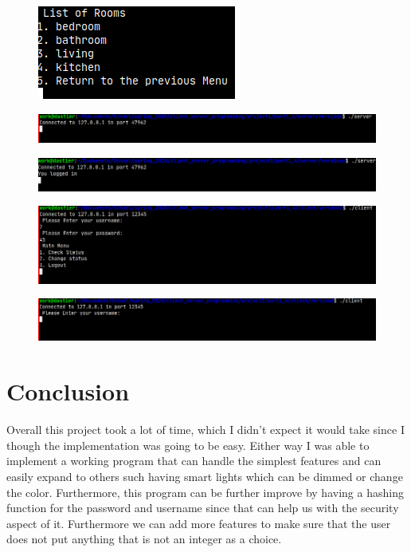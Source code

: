 \documentclass[11pt]{article}
\begin{document}
	\begin{figure}[H]
		\centering
		\includegraphics[scale=0.7]{testing_lightRoom}
		\caption[Testing check status of lights in a room]{}
		\label{fig:testinglightroom}
	\end{figure}
	\begin{figure}[H]
		\centering
		\includegraphics[scale=0.5]{testing_serverconnection}
		\caption[Testing server connection]{}
		\label{fig:testingserverconnection}
	\end{figure}
	\begin{figure}[H]
		\centering
		\includegraphics[scale=0.5]{testing_serverlogin}
		\caption[Testing server login]{}
		\label{fig:testingserverlogin}
	\end{figure}
	\begin{figure}[H]
		\centering
		\includegraphics[scale=0.5]{testing_Succesful_login}
		\caption[Testing succesfull login]{}
		\label{fig:testingsuccesfullogin}
	\end{figure}
	\begin{figure}[H]
		\centering
		\includegraphics[scale=0.5]{testing_userName}
		\caption[Testing username menu]{}
		\label{fig:testingusername}
	\end{figure}
	\section{Conclusion}
		Overall this project took a lot of time, which I didn't expect it would take since I though the implementation was going to be easy. Either way I was able to implement a working program that can handle the simplest features and can easily expand to others such having smart lights which can be dimmed or change the color. Furthermore, this program can be further improve by having a hashing function for the password and username since that can help us with the security aspect of it. Furthermore we can add more features to make sure that the user does not put anything that is not an integer as a choice.
\end{document}
